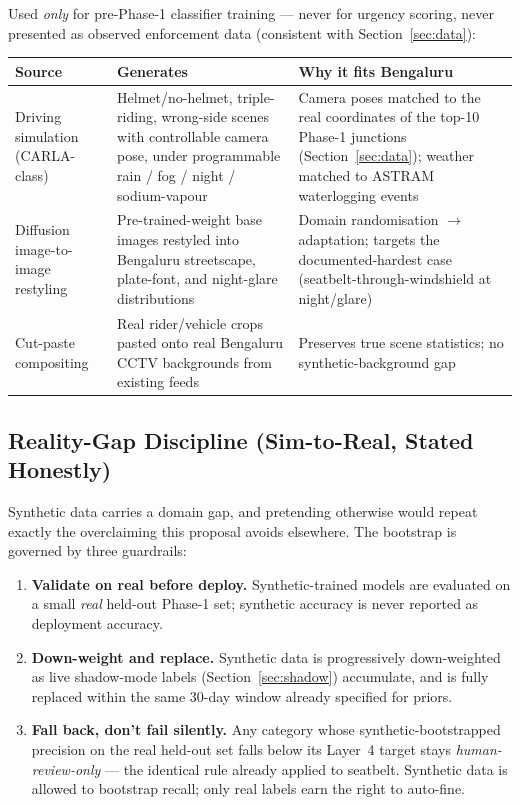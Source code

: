 \documentclass[11pt,a4paper]{article}
\begin{document}
Used \emph{only} for pre-Phase-1 classifier training --- never for urgency scoring, never presented as observed enforcement data (consistent with Section~\ref{sec:data}):

\begin{center}
\begin{tabular}{L{3.8cm} L{5.2cm} L{5.0cm}}
    \toprule
    \color{white}\textbf{Source} & \color{white}\textbf{Generates} & \color{white}\textbf{Why it fits Bengaluru} \\
    \midrule
    Driving simulation (CARLA-class) \cite{dosovitskiy2017carla} & Helmet/no-helmet, triple-riding, wrong-side scenes with controllable camera pose, under programmable rain / fog / night / sodium-vapour & Camera poses matched to the real coordinates of the top-10 Phase-1 junctions (Section~\ref{sec:data}); weather matched to ASTRAM waterlogging events \\
    Diffusion image-to-image restyling \cite{trabucco2023diffaug} & Pre-trained-weight base images restyled into Bengaluru streetscape, plate-font, and night-glare distributions & Domain randomisation $\rightarrow$ adaptation; targets the documented-hardest case (seatbelt-through-windshield at night/glare) \\
    Cut-paste compositing & Real rider/vehicle crops pasted onto real Bengaluru CCTV backgrounds from existing feeds & Preserves true scene statistics; no synthetic-background gap \\
    \bottomrule
\end{tabular}
\end{center}

\subsection*{Reality-Gap Discipline (Sim-to-Real, Stated Honestly)}

Synthetic data carries a domain gap, and pretending otherwise would repeat exactly the overclaiming this proposal avoids elsewhere. The bootstrap is governed by three guardrails:

\begin{enumerate}[leftmargin=1.8em, itemsep=0.25em]
    \item \textbf{Validate on real before deploy.} Synthetic-trained models are evaluated on a small \emph{real} held-out Phase-1 set; synthetic accuracy is never reported as deployment accuracy.
    \item \textbf{Down-weight and replace.} Synthetic data is progressively down-weighted as live shadow-mode labels (Section~\ref{sec:shadow}) accumulate, and is fully replaced within the same 30-day window already specified for priors.
    \item \textbf{Fall back, don't fail silently.} Any category whose synthetic-bootstrapped precision on the real held-out set falls below its Layer~4 target stays \emph{human-review-only} --- the identical rule already applied to seatbelt. Synthetic data is allowed to bootstrap recall; only real labels earn the right to auto-fine.
\end{enumerate}
\end{document}
